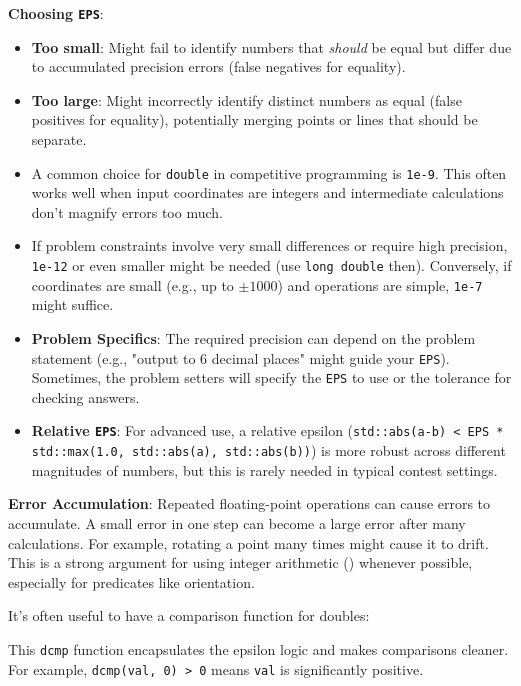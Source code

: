 \begin{tipsbox}
\label{tips:A.3.1.choose_eps}
\textbf{Choosing \texttt{EPS}}:
\begin{itemize}
    \item \textbf{Too small}: Might fail to identify numbers that \textit{should} be equal but differ due to accumulated precision errors (false negatives for equality).
    \item \textbf{Too large}: Might incorrectly identify distinct numbers as equal (false positives for equality), potentially merging points or lines that should be separate.
    \item A common choice for \texttt{double} in competitive programming is \texttt{1e-9}. This often works well when input coordinates are integers and intermediate calculations don't magnify errors too much.
    \item If problem constraints involve very small differences or require high precision, \texttt{1e-12} or even smaller might be needed (use \texttt{long double} then). Conversely, if coordinates are small (e.g., up to $\pm 1000$) and operations are simple, \texttt{1e-7} might suffice.
    \item \textbf{Problem Specifics}: The required precision can depend on the problem statement (e.g., "output to 6 decimal places" might guide your \texttt{EPS}). Sometimes, the problem setters will specify the \texttt{EPS} to use or the tolerance for checking answers.
    \item \textbf{Relative \texttt{EPS}}: For advanced use, a relative epsilon (\texttt{std::abs(a-b) < EPS * std::max(1.0, std::abs(a), std::abs(b))}) is more robust across different magnitudes of numbers, but this is rarely needed in typical contest settings.
\end{itemize}
\end{tipsbox}

\begin{gotcha}
\label{gotcha:A.3.1.eps_accumulation}
\textbf{Error Accumulation}: Repeated floating-point operations can cause errors to accumulate. A small error in one step can become a large error after many calculations. For example, rotating a point many times might cause it to drift. This is a strong argument for using integer arithmetic () whenever possible, especially for predicates like orientation.
\end{gotcha}

It's often useful to have a comparison function for doubles:

This \texttt{dcmp} function encapsulates the epsilon logic and makes comparisons cleaner. For example, \texttt{dcmp(val, 0) > 0} means \texttt{val} is significantly positive.

